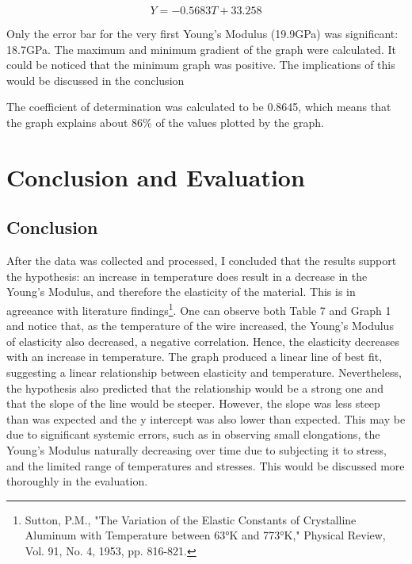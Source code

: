 \documentclass{article}
\begin{document}
\begin{equation*}
    Y = -0.5683T + 33.258
\end{equation*}

\par{Only the error bar for the very first Young's Modulus (19.9GPa) was significant: 18.7GPa. The maximum and minimum gradient of the graph were calculated. It could be noticed that the minimum graph was positive. The implications of this would be discussed in the conclusion}

\par{The coefficient of determination was calculated to be 0.8645, which means that the graph explains about $86\%$ of the values plotted by the graph. }
\vspace{-0.5cm}
\section{Conclusion and Evaluation}
\vspace{-0.5cm}
\subsection{Conclusion}
\vspace{-0.5cm}
\par{After the data was collected and processed, I concluded that the results support the hypothesis: an increase in temperature does result in a decrease in the Young's Modulus, and therefore the elasticity of the material. This is in agreeance with literature findings\footnote{Sutton, P.M., "The Variation of the Elastic Constants of Crystalline Aluminum with Temperature between 63°K and 773°K," Physical Review, Vol. 91, No. 4, 1953, pp. 816-821.}. One can observe both Table 7 and Graph 1 and notice that, as the temperature of the wire increased, the Young's Modulus of elasticity also decreased, a negative correlation. Hence, the elasticity decreases with an increase in temperature. The graph produced a linear line of best fit, suggesting a linear relationship between elasticity and temperature. Nevertheless, the hypothesis also predicted that the relationship would be a strong one and that the slope of the line would be steeper. However, the slope was less steep than was expected and the y intercept was also lower than expected. This may be due to significant systemic errors, such as in observing small elongations, the Young's Modulus naturally decreasing over time due to subjecting it to stress, and the limited range of temperatures and stresses. This would be discussed more thoroughly in the evaluation.}
\end{document}
